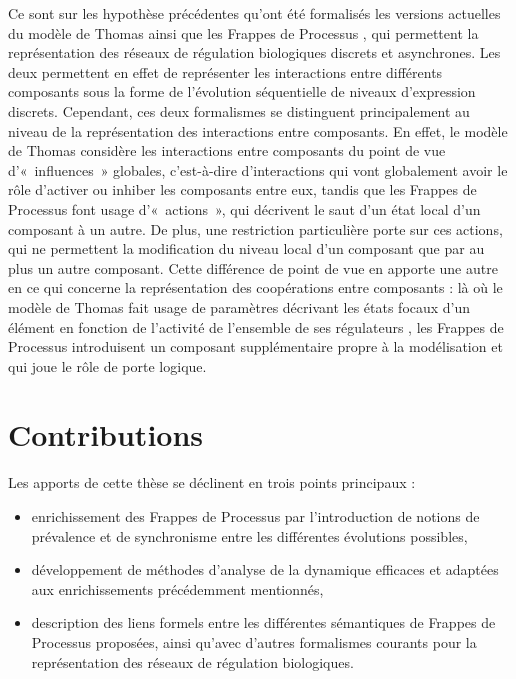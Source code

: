 Ce sont sur les hypothèse précédentes qu'ont été formalisés
les versions actuelles du modèle de Thomas \tocite[Bernot ?]
ainsi que les Frappes de Processus \tocite[Loïc'10],
qui permettent la représentation des réseaux de régulation biologiques discrets et asynchrones.
Les deux permettent en effet de représenter les interactions entre différents composants
sous la forme de l'évolution séquentielle de niveaux d'expression discrets.
Cependant, ces deux formalismes se distinguent principalement au niveau de la représentation
des interactions entre composants.
En effet, le modèle de Thomas considère les interactions entre composants du point
de vue d'«~influences~» globales, c'est-à-dire d'interactions qui vont globalement avoir
le rôle d'activer ou inhiber les composants entre eux,
tandis que les Frappes de Processus font usage d'«~actions~»,
qui décrivent le saut d'un état local d'un composant à un autre.
De plus, une restriction particulière porte sur ces actions,
qui ne permettent la modification du niveau local d'un composant
que par au plus un autre composant.
Cette différence de point de vue en apporte une autre en ce qui concerne la représentation
des coopérations entre composants :
là où le modèle de Thomas fait usage de paramètres décrivant
les états focaux d'un élément en fonction de l'activité de l'ensemble de ses régulateurs
\tocite[Snoussi],
les Frappes de Processus introduisent un composant supplémentaire propre à la modélisation
et qui joue le rôle de porte logique.



\section{Contributions}

Les apports de cette thèse se déclinent en trois points principaux :
\begin{itemize}
  \item enrichissement des Frappes de Processus par l'introduction de notions
    de prévalence et de synchronisme entre les différentes évolutions possibles,
  \item développement de méthodes d'analyse de la dynamique efficaces
    et adaptées aux enrichissements précédemment mentionnés,
  \item description des liens formels entre les différentes sémantiques de Frappes de Processus
    proposées, ainsi qu'avec d'autres formalismes courants pour la représentation
    des réseaux de régulation biologiques.
\end{itemize}

